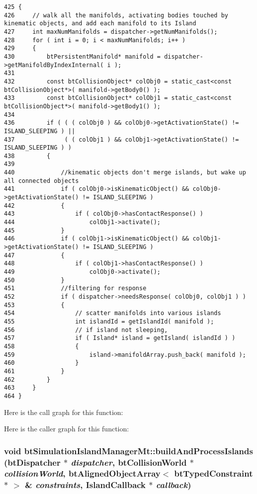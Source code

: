 \begin{Code}\begin{verbatim}425 {
426     // walk all the manifolds, activating bodies touched by kinematic objects, and add each manifold to its Island
427     int maxNumManifolds = dispatcher->getNumManifolds();
428     for ( int i = 0; i < maxNumManifolds; i++ )
429     {
430         btPersistentManifold* manifold = dispatcher->getManifoldByIndexInternal( i );
431 
432         const btCollisionObject* colObj0 = static_cast<const btCollisionObject*>( manifold->getBody0() );
433         const btCollisionObject* colObj1 = static_cast<const btCollisionObject*>( manifold->getBody1() );
434 
436         if ( ( ( colObj0 ) && colObj0->getActivationState() != ISLAND_SLEEPING ) ||
437              ( ( colObj1 ) && colObj1->getActivationState() != ISLAND_SLEEPING ) )
438         {
439 
440             //kinematic objects don't merge islands, but wake up all connected objects
441             if ( colObj0->isKinematicObject() && colObj0->getActivationState() != ISLAND_SLEEPING )
442             {
443                 if ( colObj0->hasContactResponse() )
444                     colObj1->activate();
445             }
446             if ( colObj1->isKinematicObject() && colObj1->getActivationState() != ISLAND_SLEEPING )
447             {
448                 if ( colObj1->hasContactResponse() )
449                     colObj0->activate();
450             }
451             //filtering for response
452             if ( dispatcher->needsResponse( colObj0, colObj1 ) )
453             {
454                 // scatter manifolds into various islands
455                 int islandId = getIslandId( manifold );
456                 // if island not sleeping,
457                 if ( Island* island = getIsland( islandId ) )
458                 {
459                     island->manifoldArray.push_back( manifold );
460                 }
461             }
462         }
463     }
464 }
\end{verbatim}
\end{Code}




Here is the call graph for this function:

Here is the caller graph for this function:\hypertarget{classbt_simulation_island_manager_mt_9be20c991c57ec972eb33a160d6276fd}{
\subsubsection[buildAndProcessIslands]{\setlength{\rightskip}{0pt plus 5cm}void btSimulationIslandManagerMt::buildAndProcessIslands ({\bf btDispatcher} $\ast$ {\em dispatcher}, \/  {\bf btCollisionWorld} $\ast$ {\em collisionWorld}, \/  {\bf btAlignedObjectArray}$<$ btTypedConstraint $\ast$ $>$ \& {\em constraints}, \/  IslandCallback $\ast$ {\em callback})}}
\label{classbt_simulation_island_manager_mt_9be20c991c57ec972eb33a160d6276fd}


